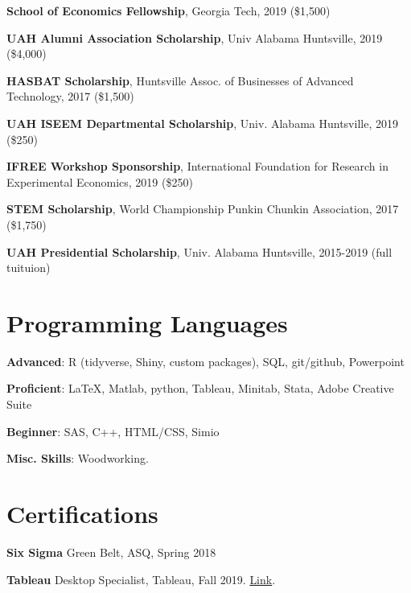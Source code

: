 \documentclass[margin,line]{res}
\begin{document}
\begin{resume}
{\bf School of Economics Fellowship}, Georgia Tech, 2019 (\$1,500)
\vspace*{-3.5mm}

{\bf UAH Alumni Association Scholarship}, Univ Alabama Huntsville, 2019 (\$4,000)
\vspace*{-3.5mm}

{\bf HASBAT Scholarship}, Huntsville Assoc. of Businesses of Advanced Technology, 2017 (\$1,500)
\vspace*{-3.5mm}

{\bf UAH ISEEM Departmental Scholarship}, Univ. Alabama Huntsville, 2019 (\$250)
\vspace*{-3.5mm}

{\bf IFREE Workshop Sponsorship}, International Foundation for Research in Experimental Economics, 2019 (\$250)
\vspace*{-3.5mm}

{\bf STEM Scholarship}, World Championship Punkin Chunkin Association, 2017 (\$1,750)
\vspace*{-3.5mm}

{\bf UAH Presidential Scholarship}, Univ. Alabama Huntsville, 2015-2019 (full tuituion)
\vspace*{-3.5mm}




\vspace{.75cm}
\section{\sc Programming Languages} 
{\bf Advanced}:  R (tidyverse, Shiny, custom packages), SQL, git/github, Powerpoint
\vspace*{-3mm}

{\bf Proficient}:  \LaTeX, Matlab, python, Tableau, Minitab, Stata, Adobe Creative Suite
\vspace*{-3mm}

{\bf Beginner}:  SAS, C++, HTML/CSS, Simio
\vspace*{-3mm}

{\bf Misc. Skills}: Woodworking. 

\vspace{.75cm}
\section{\sc Certifications}
{\bf Six Sigma} Green Belt, ASQ, Spring 2018
\vspace*{-3mm}

{\bf Tableau} Desktop Specialist, Tableau, Fall 2019. \href{https://www.credly.com/badges/e9a605a8-1977-4a1c-ab24-149a37c7fb36/linked_in_profile}{Link}.
\vspace*{-3mm}


\end{resume}
\end{document}
